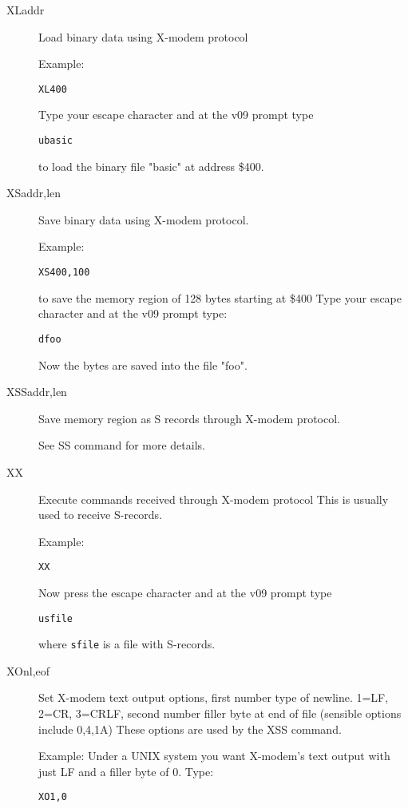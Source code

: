 \begin{description}
\item[XLaddr]     Load binary data using X-modem protocol

Example:
\begin{verbatim}
XL400
\end{verbatim}
Type your escape character and at the v09 prompt type
\begin{verbatim}
ubasic
\end{verbatim}
to load the binary file "basic" at address \$400.

\item[XSaddr,len] Save binary data using X-modem protocol.

Example:
\begin{verbatim}
XS400,100 
\end{verbatim}
to save the memory region of 128 bytes starting at \$400
Type your escape character and at the v09 prompt type:
\begin{verbatim}
dfoo
\end{verbatim}
Now the bytes are saved into the file "foo".

\item[XSSaddr,len] Save memory region as S records through X-modem protocol.

See SS command for more details.

\item[XX]         Execute commands received through X-modem protocol 
           This is usually used to receive S-records.  

Example:
\begin{verbatim}
XX
\end{verbatim}
Now press the escape character and at the v09 prompt type 
\begin{verbatim}
usfile
\end{verbatim}
where {\tt sfile} is a file with S-records.

\item[XOnl,eof]   Set X-modem text output options, first number type of newline.
           1=LF, 2=CR, 3=CRLF, second number filler byte at end of file
           (sensible options include 0,4,1A) These options are used by
           the XSS command.

Example: Under a UNIX system you want X-modem's text output with just LF
         and a filler byte of 0. Type:
\begin{verbatim}      
XO1,0
\end{verbatim}
\end{description}

